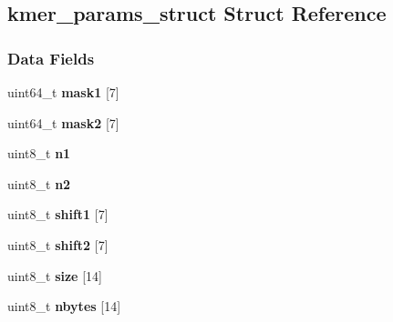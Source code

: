 \hypertarget{structkmer__params__struct}{}\subsection{kmer\+\_\+params\+\_\+struct Struct Reference}
\label{structkmer__params__struct}
\subsubsection*{Data Fields}
\begin{DoxyCompactItemize}
\item 
\mbox{\label{structkmer__params__struct_af80e5776dcc1f7f4dfae6c7b79b595b8}} 
uint64\+\_\+t {\bfseries mask1} \mbox{[}7\mbox{]}
\item 
\mbox{\label{structkmer__params__struct_aaa66a8435750e8ab831b0e7a1b0c3e70}} 
uint64\+\_\+t {\bfseries mask2} \mbox{[}7\mbox{]}
\item 
\mbox{\label{structkmer__params__struct_aab6dd54402fc241b6ef822e77228b1b7}} 
uint8\+\_\+t {\bfseries n1}
\item 
\mbox{\label{structkmer__params__struct_a4f6a79e0e4646fcbf2b05c39a6b9831a}} 
uint8\+\_\+t {\bfseries n2}
\item 
\mbox{\label{structkmer__params__struct_a575a2bacb5248cdd4f22c29042941352}} 
uint8\+\_\+t {\bfseries shift1} \mbox{[}7\mbox{]}
\item 
\mbox{\label{structkmer__params__struct_a1907bcc459d99eb614c37bf5211907e2}} 
uint8\+\_\+t {\bfseries shift2} \mbox{[}7\mbox{]}
\item 
\mbox{\label{structkmer__params__struct_af55607c5032ea68b776b00e5c680adc8}} 
uint8\+\_\+t {\bfseries size} \mbox{[}14\mbox{]}
\item 
\mbox{\label{structkmer__params__struct_ad1cee61f4361f4c90e96d33dd76ee59e}} 
uint8\+\_\+t {\bfseries nbytes} \mbox{[}14\mbox{]}
\item 

\end{DoxyCompactItemize}
